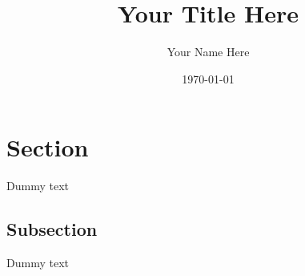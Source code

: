 \documentclass[11pt, a4paper]{article}
\title{Your Title Here}
\author{Your Name Here}
\date{\today}
\begin{document}
    \maketitle
    \tableofcontents
    \newpage


    \section{Section}
    Dummy text

    \subsection{Subsection}
    Dummy text
\end{document}
